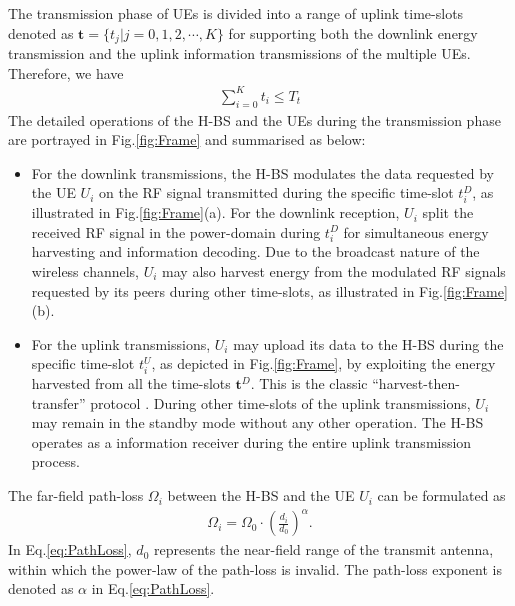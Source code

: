 \documentclass[12pt,draftcls,onecolumn,journal]{IEEEtran}
\begin{document}
The transmission phase of UEs is divided into a range of uplink time-slots denoted as $\mathbf{t} = \{t_j | j=0, 1,2,\cdots, K\}$ for supporting both the downlink energy transmission and the uplink information transmissions of the multiple UEs. Therefore, we have
\begin{align}
\sum_{i=0}^{K} t_i \leq T_t
\end{align}
The detailed operations of the H-BS and the UEs during the transmission phase are portrayed in Fig.\ref{fig:Frame} and summarised as below:
\begin{itemize}
	\item For the downlink transmissions, the H-BS modulates the data requested by the UE $U_i$ on the RF signal transmitted during the specific time-slot $t_i^D$, as illustrated in Fig.\ref{fig:Frame}(a). For the downlink reception, $U_i$ split the received RF signal in the power-domain during $t_i^D$ for simultaneous energy harvesting and information decoding. Due to the broadcast nature of the wireless channels, $U_i$ may also harvest energy from the modulated RF signals requested by its peers during other time-slots, as illustrated in Fig.\ref{fig:Frame}(b).
	\item For the uplink transmissions, $U_i$ may upload its data to the H-BS during the specific time-slot $t_i^U$, as depicted in Fig.\ref{fig:Frame}, by exploiting the energy harvested from all the time-slots $\mathbf{t}^{D}$. This is the classic ``harvest-then-transfer'' protocol \cite{wpcn_1}. During other time-slots of the uplink transmissions, $U_i$ may remain in the standby mode without any other operation. The H-BS operates as a information receiver during the entire uplink transmission process.
\end{itemize}


The far-field path-loss $\Omega_i$ between the H-BS and the UE $U_i$ can be formulated as
\begin{align}
\Omega_i = \Omega_0 \cdot \left(\frac{d_i}{d_0}\right)^{\alpha}. \label{eq:PathLoss}
\end{align}
In Eq.\eqref{eq:PathLoss}, $d_0$ represents the near-field range of the transmit antenna, within which the power-law of the path-loss is invalid. The path-loss exponent is denoted as $\alpha$ in Eq.\eqref{eq:PathLoss}.
\end{document}
